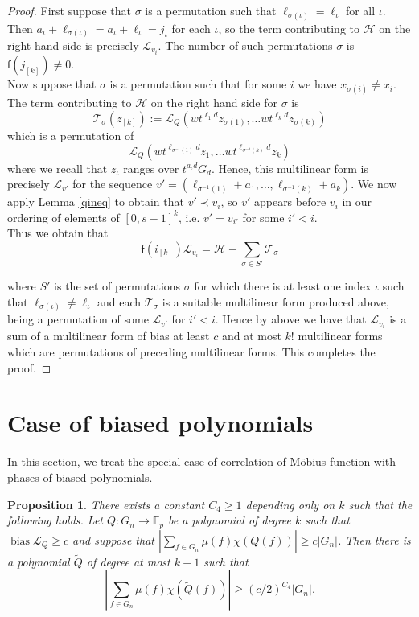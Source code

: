 \documentclass[a4paper,11pt]{article}
\newtheorem{proposition}[theorem]{Proposition}
\theoremstyle{definition}
\newcommand{\on}[1]{
	\operatorname{#1}
}
\begin{document}
\begin{proof}
First suppose that $\sigma$ is a permutation such that $\ell_{\sigma(\iota)} = \ell_\iota$ for all $\iota$. Then $a_\iota + \ell_{\sigma(\iota)} = a_\iota + \ell_\iota = j_\iota$ for each $\iota$, so the term contributing to $\mathcal{H}$ on the right hand side is precisely $\mathcal{L}_{v_i}$. The number of such permutations $\sigma$ is $\mathsf{f}(j_{[k]}) \neq 0$. \\

Now suppose that $\sigma $ is a permutation such that for some $i$ we have $x_{\sigma(i)}\neq x_i$. The term contributing to $\mathcal{H}$ on the right hand side for $\sigma$ is 
\[\mathcal{T}_\sigma(z_{[k]}) := \mathcal{L}_Q(wt^{\ell_1d}z_{\sigma(1)},\ldots wt^{\ell_kd}z_{\sigma(k)})\]
which is a permutation of 
\[\mathcal{L}_Q(wt^{\ell_{\sigma^{-1}(1)}d}z_1,\ldots wt^{\ell_{\sigma^{-1}(k)}d}z_{k})\]
where we recall that $z_\iota$ ranges over $t^{a_\iota d}G_d$. Hence, this multilinear form is precisely $\mathcal{L}_{v'}$ for the sequence $v' = (\ell_{\sigma^{-1}(1)} + a_1, \dots, \ell_{\sigma^{-1}(k)} + a_k)$. We now apply Lemma \ref{qineq} to obtain that $v' \prec v_i$, so $v'$ appears before $v_i$ in our ordering of elements of $[0, s-1]^k$, i.e. $v' =v_{i'}$ for some $i'<i$.\\

Thus  we obtain that 
\[
\mathsf{f}(i_{[k]})\mathcal{L}_{v_i} = \mathcal{H} - \sum_{\sigma \in S'} \mathcal{T}_{\sigma}
\]

where $S'$ is the set of permutations $\sigma$ for which there is at least one index $\iota$ such that $\ell_{\sigma(\iota)} \neq \ell_\iota$ and each $\mathcal{T}_{\sigma}$ is a suitable multilinear form produced above, being a permutation of some $\mathcal{L}_{v'}$ for $i' < i$. Hence by above we have that $\mathcal{L}_{v_i}$ is a sum of a multilinear form of bias at least $c$ and at most $k!$ multilinear forms which are permutations of preceding multilinear forms. This completes the proof.
\end{proof}



\section{Case of biased polynomials}

In this section, we treat the special case of correlation of M\"obius function with phases of biased polynomials.

\begin{proposition}\label{red_to_alg}
    There exists a constant $C_4 \geq 1$ depending only on $k$ such that the following holds. Let $Q : G_n \to \mathbb{F}_p$ be a polynomial of degree $k$ such that $\on{bias} \mathcal{L}_Q \geq c$ and suppose that $|\sum_{f\in G_n}\mu(f)\chi(Q(f))| \geq c|G_n|$. Then there is a polynomial $\tilde{Q}$ of degree at most $k-1$ such that
    \[|\sum_{f\in G_n}\mu(f)\chi(\tilde{Q}(f))| \geq (c/2)^{C_4}|G_n|.\]
\end{proposition}
\end{document}
